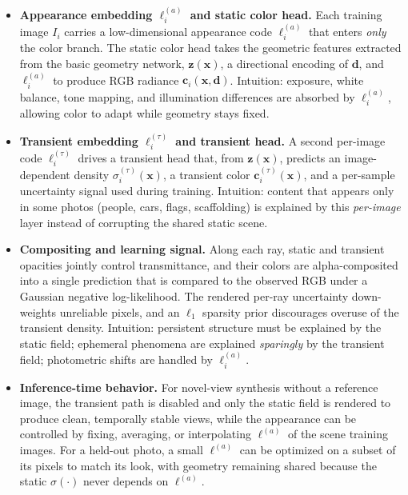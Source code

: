 \begin{enrichment}
\begin{enrichment}
\begin{itemize}[leftmargin=*,itemsep=0.3em]
            \item \textbf{Appearance embedding \(\ell^{(a)}_i\) and static color head.} Each training image \(I_i\) carries a low-dimensional appearance code \(\ell^{(a)}_i\) that enters \emph{only} the color branch. The static color head takes the geometric features extracted from the basic geometry network, \(\mathbf{z}(\mathbf{x})\), a directional encoding of \(\mathbf{d}\), and \(\ell^{(a)}_i\) to produce RGB radiance \(\mathbf{c}_i(\mathbf{x},\mathbf{d})\). Intuition: exposure, white balance, tone mapping, and illumination differences are absorbed by \(\ell^{(a)}_i\), allowing color to adapt while geometry stays fixed.
            \item \textbf{Transient embedding \(\ell^{(\tau)}_i\) and transient head.} A second per-image code \(\ell^{(\tau)}_i\) drives a transient head that, from \(\mathbf{z}(\mathbf{x})\), predicts an image-dependent density \(\sigma^{(\tau)}_i(\mathbf{x})\), a transient color \(\mathbf{c}^{(\tau)}_i(\mathbf{x})\), and a per-sample uncertainty signal used during training. Intuition: content that appears only in some photos (people, cars, flags, scaffolding) is explained by this \emph{per-image} layer instead of corrupting the shared static scene.
            \item \textbf{Compositing and learning signal.} Along each ray, static and transient opacities jointly control transmittance, and their colors are alpha-composited into a single prediction that is compared to the observed RGB under a Gaussian negative log-likelihood. The rendered per-ray uncertainty down-weights unreliable pixels, and an \(\ell_1\) sparsity prior discourages overuse of the transient density. Intuition: persistent structure must be explained by the static field; ephemeral phenomena are explained \emph{sparingly} by the transient field; photometric shifts are handled by \(\ell^{(a)}_i\).
            \item \textbf{Inference-time behavior.} For novel-view synthesis without a reference image, the transient path is disabled and only the static field is rendered to produce clean, temporally stable views, while the appearance can be controlled by fixing, averaging, or interpolating \(\ell^{(a)}\) of the scene training images. For a held-out photo, a small \(\ell^{(a)}\) can be optimized on a subset of its pixels to match its look, with geometry remaining shared because the static \(\sigma(\cdot)\) never depends on \(\ell^{(a)}\).
        \end{itemize}
        

\end{enrichment}
\end{enrichment}
